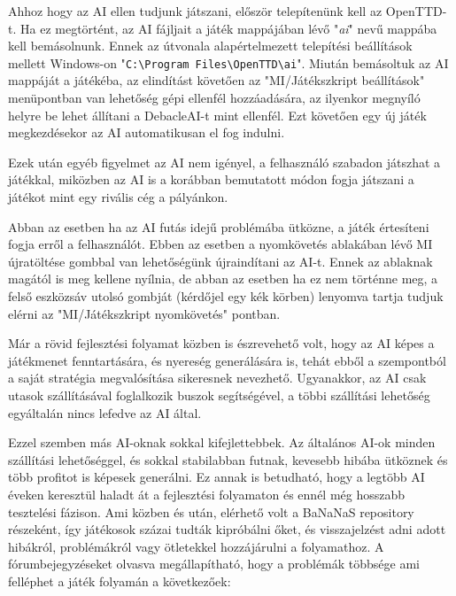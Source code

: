 

Ahhoz hogy az AI ellen tudjunk játszani, először telepítenünk kell az OpenTTD-t. Ha ez megtörtént, az AI fájljait a játék mappájában lévő "\textit{ai}" nevű mappába kell bemásolnunk. Ennek az útvonala alapértelmezett telepítési beállítások mellett Windows-on "\texttt{C:\textbackslash Program Files\textbackslash OpenTTD\textbackslash ai}". Miután bemásoltuk az AI mappáját a játékéba, az elindítást követően az "MI/Játékszkript beállítások" menüpontban van lehetőség gépi ellenfél hozzáadására, az ilyenkor megnyíló helyre be lehet állítani a DebacleAI-t mint ellenfél. Ezt követően egy új játék megkezdésekor az AI automatikusan el fog indulni.

Ezek után egyéb figyelmet az AI nem igényel, a felhasználó szabadon játszhat a játékkal, miközben az AI is a korábban bemutatott módon fogja játszani a játékot mint egy rivális cég a pályánkon.

Abban az esetben ha az AI futás idejű problémába ütközne, a játék értesíteni fogja erről a felhasználót. Ebben az esetben a nyomkövetés ablakában lévő MI újratöltése gombbal van lehetőségünk újraindítani az AI-t. Ennek az ablaknak magától is meg kellene nyílnia, de abban az esetben ha ez nem történne meg, a felső eszközsáv utolsó gombját (kérdőjel egy kék körben) lenyomva tartja tudjuk elérni az "MI/Játékszkript nyomkövetés" pontban.


Már a rövid fejlesztési folyamat közben is észrevehető volt, hogy az AI képes a játékmenet fenntartására, és nyereség generálására is, tehát ebből a szempontból a saját stratégia megvalósítása sikeresnek nevezhető. Ugyanakkor, az AI csak utasok szállításával foglalkozik buszok segítségével, a többi szállítási lehetőség egyáltalán nincs lefedve az AI által.

Ezzel szemben más AI-oknak sokkal kifejlettebbek. Az általános AI-ok minden szállítási lehetőséggel, és sokkal stabilabban futnak, kevesebb hibába ütköznek és több profitot is képesek generálni. Ez annak is betudható, hogy a legtöbb AI éveken keresztül haladt át a fejlesztési folyamaton és ennél még hosszabb tesztelési fázison. Ami közben és után, elérhető volt a BaNaNaS repository részeként, így játékosok százai tudták kipróbálni őket, és visszajelzést adni adott hibákról, problémákról vagy ötletekkel hozzájárulni a folyamathoz. A fórumbejegyzéseket olvasva megállapítható, hogy a problémák többsége ami felléphet a játék folyamán a következőek: 

